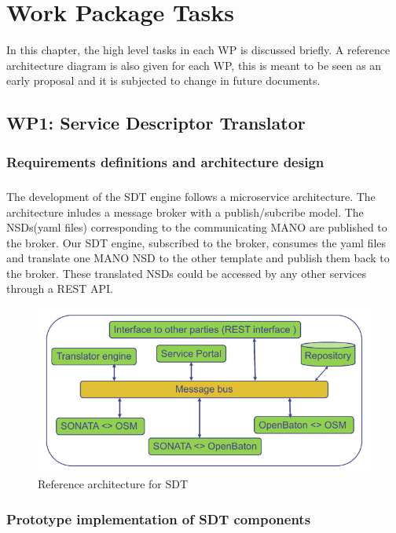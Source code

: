 \chapter{Work Package Tasks}
\label{ch:wptasks}

In this chapter, the high level tasks in each WP is discussed briefly. A reference architecture diagram is also given for each WP, this is meant to be seen as an early proposal and it is subjected to change in future documents.

\section{WP1: Service Descriptor Translator}

\subsection{Requirements definitions and architecture design}
\paragraph{}
The development of the SDT engine follows a microservice architecture. The architecture inludes a message broker with a publish/subcribe model. The NSDs(yaml files) corresponding to the communicating MANO are published to the broker. Our SDT engine, subscribed to the broker, consumes the yaml files and translate one MANO NSD to the other template and publish them back to the broker. These translated NSDs could be accessed by any other services through a REST API.
\begin{figure}[h]
	\centering
	\includegraphics[width=0.9\linewidth]{figures/wp1Arch}
	\caption{Reference architecture for SDT \cite{WPDescriptionsPDF}}
	\label{fig:wp1arch}
\end{figure}

\subsection{Prototype implementation of SDT components}
